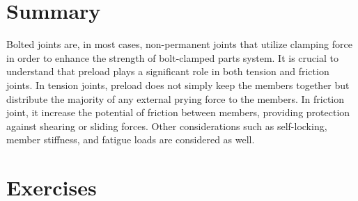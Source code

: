 \documentclass[
10pt,
a4paper,
openany,
svgnames,
]{book}
\begin{document}
\section*{Summary}

Bolted joints are, in most cases, non-permanent joints that utilize clamping force in order to enhance the strength of bolt-clamped parts system. It is crucial to understand that preload plays a significant role in both tension and friction joints. In tension joints, preload does not simply keep the members together but distribute the majority of any external prying force to the members. In friction joint, it increase the potential of friction between members, providing protection against shearing or sliding forces. Other considerations such as self-locking, member stiffness, and fatigue loads are considered as well.

\section*{Exercises}
\end{document}
